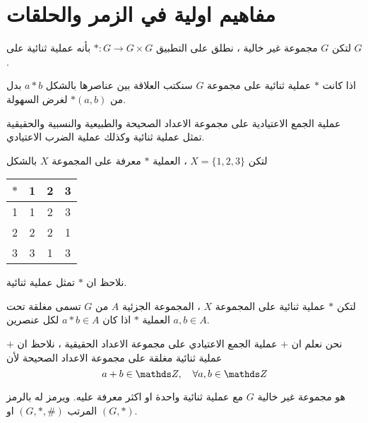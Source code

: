 \chapter{مفاهيم اولية في الزمر والحلقات}

\begin{definition}
	لتكن $G$ مجموعة غير خالية ، نطلق على التطبيق $*:G\to G\times G$ بأنه عملية ثنائية على $G$.
\end{definition}

\begin{note}
	اذا كانت $*$ عملية ثنائية على مجموعة $G$ سنكتب العلاقة بين عناصرها بالشكل $a*b$ بدل من $*(a, b)$ لغرض السهولة.
\end{note}

\begin{example}
عملية الجمع الاعتيادية على مجموعة الاعداد الصحيحة والطبيعية والنسبية والحقيقية تمثل عملية ثنائية وكذلك عملية الضرب الاعتيادي. 
\end{example}

\begin{example}
	لتكن $X = \{1,2,3\}$ ، العملية $*$ معرفة على المجموعة $X$ بالشكل
	\begin{table}[H]
		\renewcommand{\arraystretch}{1.4}
		\centering
		\setLR
		\begin{tabular}{|c|c|c|c|}
			\hline
			$*$ & 1&2&3\\
			\hline
			1&1&2&3\\
			\hline
			2&2&2&1\\
			\hline
			3&3&1&3\\
			\hline
		\end{tabular}
	\end{table}
	\setRL\noindent
	نلاحظ ان $*$ تمثل عملية ثنائية.
\end{example}

\begin{definition}
	لتكن $*$ عملية ثنائية على المجموعة $X$ ، المجموعة الجزئية $A$ من $G$ تسمى مغلقة تحت العملية $*$ اذا كان $a*b \in A$ لكل عنصرين $a, b\in A$.
\end{definition}

\begin{example}
	نحن نعلم ان $+$ عملية الجمع الاعتيادي على مجموعة الاعداد الحقيقية ، نلاحظ ان $+$ عملية ثنائية مغلقة على مجموعة الاعداد الصحيحة لأن
	\[
	a+b \in \Z ,\quad \forall a, b\in \Z
	\]
\end{example}

\begin{definition}
	هو مجموعة غير خالية $G$ مع عملية ثنائية واحدة او اكثر معرفة عليه. ويرمز له بالرمز المرتب $(G, *, \#)$ او $(G, *)$.
\end{definition}

